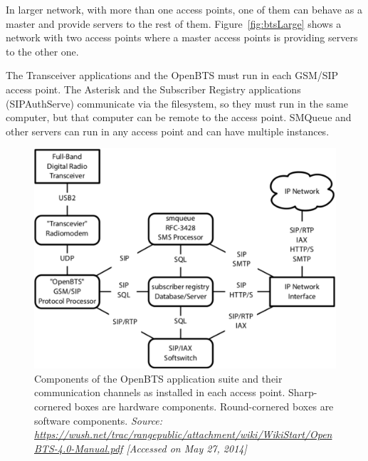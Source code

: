 In larger network, with more than one access points, one of them can behave as a master and provide servers to the rest of them.
Figure~\ref{fig:btsLarge} shows a network with two access points where
a master access points is providing servers to the other one.

The Transceiver applications and the OpenBTS must run in each GSM/SIP access point. 
The Asterisk and the Subscriber Registry applications (SIPAuthServe) 
communicate via the filesystem, so they must run in the same computer,
but that computer can be remote to the access point. 
SMQueue and other servers can run in any access point and can have 
multiple instances.
\begin{figure}
  \centering
    \includegraphics[width=\textwidth]{btsSimple}
  \caption[Simplest OpenBTS network]{Components of the OpenBTS application suite 
  and their communication channels as installed in each
access point. Sharp-cornered boxes are hardware components.
Round-cornered boxes are software components.
\emph{Source: \url{https://wush.net/trac/rangepublic/attachment/wiki/WikiStart/OpenBTS-4.0-Manual.pdf} [Accessed on May 27, 2014]}}
  \label{fig:btsSimple}
\end{figure}

